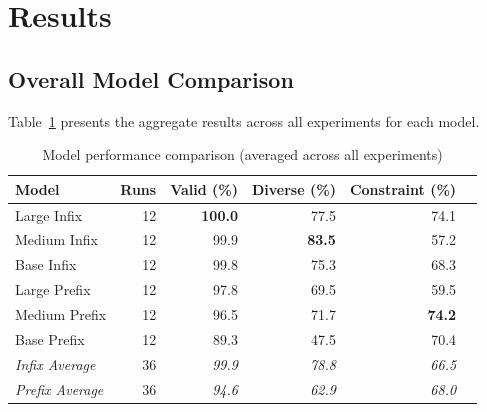 \documentclass[11pt,a4paper]{article}
\begin{document}
\section{Results}

\subsection{Overall Model Comparison}

Table~\ref{tab:model_comparison} presents the aggregate results across all experiments for each model.

\begin{table}[H]
\centering
\caption{Model performance comparison (averaged across all experiments)}
\label{tab:model_comparison}
\begin{tabular}{lrrrrr}
\toprule
\textbf{Model} & \textbf{Runs} & \textbf{Valid (\%)} & \textbf{Diverse (\%)} & \textbf{Constraint (\%)} \\
\midrule
Large Infix & 12 & \textbf{100.0} & 77.5 & 74.1 \\
Medium Infix & 12 & 99.9 & \textbf{83.5} & 57.2 \\
Base Infix & 12 & 99.8 & 75.3 & 68.3 \\
Large Prefix & 12 & 97.8 & 69.5 & 59.5 \\
Medium Prefix & 12 & 96.5 & 71.7 & \textbf{74.2} \\
Base Prefix & 12 & 89.3 & 47.5 & 70.4 \\
\midrule
\textit{Infix Average} & 36 & \textit{99.9} & \textit{78.8} & \textit{66.5} \\
\textit{Prefix Average} & 36 & \textit{94.6} & \textit{62.9} & \textit{68.0} \\
\bottomrule
\end{tabular}
\end{table}
\end{document}
